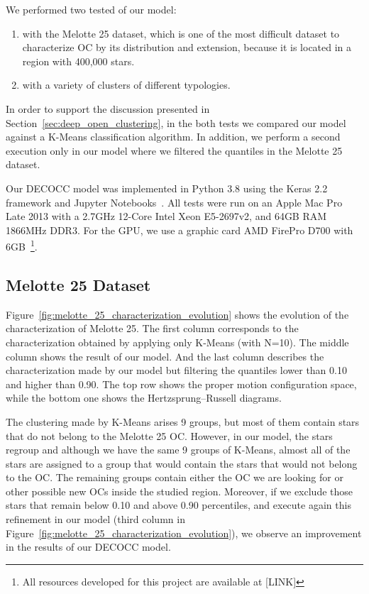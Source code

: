 \documentclass[preprint,12pt,authoryear]{elsarticle}
\begin{document}
We performed two tested of our model:

\begin{enumerate}
  \item with the Melotte 25 dataset, which is one of the most difficult dataset to characterize OC by its distribution and extension, because it is located in a region with 400,000 stars.
  \item with a variety of clusters of different typologies.
\end{enumerate}

In order to support the discussion presented in Section~\ref{sec:deep_open_clustering}, in the both tests we compared our model against a K-Means classification algorithm. In addition, we perform a second execution only in our model where we filtered the quantiles in the Melotte 25 dataset.

Our DECOCC model was implemented in Python 3.8 using the Keras 2.2 framework and Jupyter Notebooks~\cite{Kluyver2016jupyter}. All tests were run on an Apple Mac Pro Late 2013 with a 2.7GHz 12-Core Intel Xeon E5-2697v2, and 64GB RAM 1866MHz DDR3. For the GPU, we use a graphic card AMD FirePro D700 with 6GB~\footnote{All resources developed for this project are available at [LINK]}.


\subsection{Melotte 25 Dataset}

Figure~\ref{fig:melotte_25_characterization_evolution} shows the evolution of the characterization of Melotte 25. The first column corresponds to the characterization obtained by applying only K-Means (with N=10). The middle column shows the result of our model. And the last column describes the characterization made by our model but filtering the quantiles lower than 0.10 and higher than 0.90. The top row shows the proper motion configuration space, while the bottom one shows the Hertzsprung–Russell diagrams.


The clustering made by K-Means arises 9 groups, but most of them contain stars that do not belong to the Melotte 25 OC. However, in our model, the stars regroup and although we have the same 9 groups of K-Means, almost all of the stars are assigned to a group that would contain the stars that would not belong to the OC. The remaining groups contain either the OC we are looking for or other possible new OCs inside the studied region. Moreover, if we exclude those stars that remain below 0.10 and above 0.90 percentiles, and execute again this refinement in our model (third column in Figure~\ref{fig:melotte_25_characterization_evolution}), we observe an improvement in the results of our DECOCC model.
\end{document}

